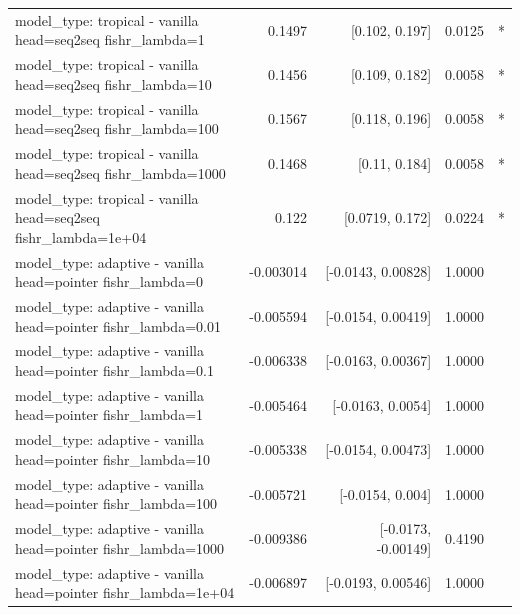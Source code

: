 \documentclass[10pt]{article}
\makeatletter
\newcommand{\stackcell}[1]{\begin{tabular}[t]{@{}l@{}}#1\end{tabular}}
\makeatother
\begin{document}
{\begin{longtable}{lrrrl}
\stackcell{model\_type: tropical - vanilla\\\footnotesize head=seq2seq fishr\_lambda=1 } & 0.1497 & [0.102, 0.197] & 0.0125 & *\\
\stackcell{model\_type: tropical - vanilla\\\footnotesize head=seq2seq fishr\_lambda=10 } & 0.1456 & [0.109, 0.182] & 0.0058 & *\\
\stackcell{model\_type: tropical - vanilla\\\footnotesize head=seq2seq fishr\_lambda=100 } & 0.1567 & [0.118, 0.196] & 0.0058 & *\\
\stackcell{model\_type: tropical - vanilla\\\footnotesize head=seq2seq fishr\_lambda=1000 } & 0.1468 & [0.11, 0.184] & 0.0058 & *\\
\stackcell{model\_type: tropical - vanilla\\\footnotesize head=seq2seq fishr\_lambda=1e+04 } & 0.122 & [0.0719, 0.172] & 0.0224 & *\\
\stackcell{model\_type: adaptive - vanilla\\\footnotesize head=pointer fishr\_lambda=0 } & -0.003014 & [-0.0143, 0.00828] & 1.0000 & \\
\stackcell{model\_type: adaptive - vanilla\\\footnotesize head=pointer fishr\_lambda=0.01 } & -0.005594 & [-0.0154, 0.00419] & 1.0000 & \\
\stackcell{model\_type: adaptive - vanilla\\\footnotesize head=pointer fishr\_lambda=0.1 } & -0.006338 & [-0.0163, 0.00367] & 1.0000 & \\
\stackcell{model\_type: adaptive - vanilla\\\footnotesize head=pointer fishr\_lambda=1 } & -0.005464 & [-0.0163, 0.0054] & 1.0000 & \\
\stackcell{model\_type: adaptive - vanilla\\\footnotesize head=pointer fishr\_lambda=10 } & -0.005338 & [-0.0154, 0.00473] & 1.0000 & \\
\stackcell{model\_type: adaptive - vanilla\\\footnotesize head=pointer fishr\_lambda=100 } & -0.005721 & [-0.0154, 0.004] & 1.0000 & \\
\stackcell{model\_type: adaptive - vanilla\\\footnotesize head=pointer fishr\_lambda=1000 } & -0.009386 & [-0.0173, -0.00149] & 0.4190 & \\
\stackcell{model\_type: adaptive - vanilla\\\footnotesize head=pointer fishr\_lambda=1e+04 } & -0.006897 & [-0.0193, 0.00546] & 1.0000 & \\

\end{longtable}}
\end{document}
